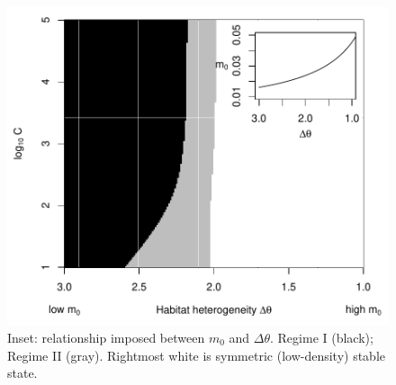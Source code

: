\documentclass{revtex4}
\begin{document}
\begin{figure}
  \captionsetup{justification=raggedright,
singlelinecheck=false
}
\centering
\includegraphics[width=1\textwidth]{fig_hysteresis_ddm_mtheta.pdf}
\caption{
Inset: relationship imposed between $m_0$ and $\Delta\theta$.
Regime I (black); Regime II (gray). Rightmost white is symmetric (low-density) stable state.
} \label{fig:mtheta}
\end{figure}
\end{document}
